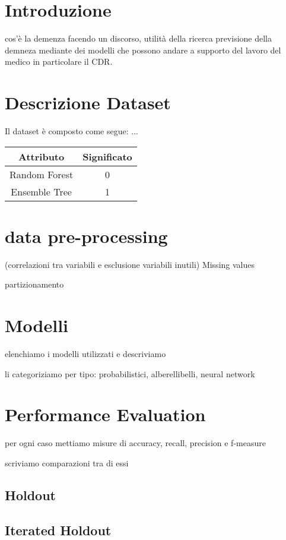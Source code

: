 \documentclass[10pt, a4paper,openany]{article}
\begin{document}
\begin{multicols}{2}
	
\section{Introduzione}
cos'è la demenza facendo un discorso, utilità della ricerca
previsione della demneza mediante dei modelli che possono andare a supporto del lavoro del medico in particolare il CDR.
\section{Descrizione Dataset}
Il dataset è composto come segue:
...

\begin{table}[H]
	\begin{tabular}{cc}
		\hline
		Attributo         & Significato         \\
		\hline
		Random Forest          & 0            \\
		Ensemble Tree         & 1           \\
		\hline
	\end{tabular}
\end{table}

\section{data pre-processing} (correlazioni tra variabili e esclusione variabili inutili) 
Missing values

partizionamento
\section{Modelli}
elenchiamo i modelli utilizzati e descriviamo

li categoriziamo per tipo: probabilistici, alberellibelli, neural network
\section{Performance Evaluation}
per ogni caso mettiamo misure di accuracy, recall, precision e f-measure

scriviamo comparazioni tra di essi
\subsection{Holdout}
\subsection{Iterated Holdout}

\end{multicols}
\end{document}
